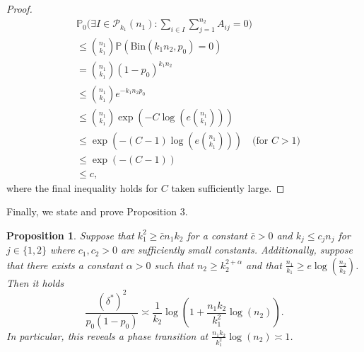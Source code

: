 \documentclass{article}
\newcommand{\bbP}{\mathbb{P}}
\newtheorem{proposition}{Proposition}
\begin{document}
\begin{proof}
    \begin{align*}
    &\bbP_0\Big(\exists I \in \mathcal{P}_{k_1}(n_1): \sum_{i \in I} \sum_{j=1}^{n_2} A_{ij} = 0\Big) \\ 
    &\leq {n_1 \choose k_1} \bbP\left(\text{Bin}(k_1n_2, p_0) = 0\right) \\
    &=  {n_1 \choose k_1}(1 - p_0)^{k_1n_2} \\
    &\leq {n_1 \choose k_1} e^{-k_1n_2 p_0} \\
    &\leq {n_1 \choose k_1} \exp \left(-C\log\left(e{n_1 \choose k_1}\right)\right) \\
    &\leq \exp \left(-(C - 1)\log\left(e{n_1 \choose k_1}\right)\right) \quad \text{(for $C > 1$)} \\
    &\leq \exp\left(-(C - 1)\right) \\
    &\leq c,
\end{align*}
where the final inequality holds for $C$ taken sufficiently large.
\end{proof}
Finally, we state and prove Proposition 3.
\begin{proposition}
Suppose that $k_1^2 \geq \bar{c}n_1 k_2$ for a constant $\bar{c} > 0$ and $k_j \leq c_j n_j$ for $j \in \{1, 2\}$ where $c_1,c_2 > 0$ are sufficiently small constants. Additionally, suppose that there exists a constant $\alpha > 0$ such that $n_2 \geq k_2^{2 + \alpha}$ and that $\frac{n_1}{k_1} \geq e \log(\frac{n_2}{k_2})$. Then it holds
\begin{equation}
    \frac{(\delta^*)
^2}{p_0(1-p_0)} \asymp \frac{1}{k_2}\log\left(1 + \frac{n_1k_2}{k_1^2}\log(n_2)\right).
\end{equation}
In particular, this reveals a phase transition at $\frac{n_1k_2}{k_1^2}\log(n_2)\asymp 1$.
\end{proposition}
\end{document}

